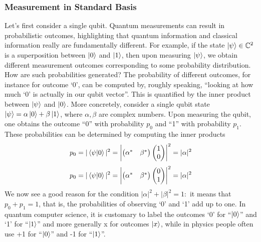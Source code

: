 \subsubsection{Measurement in Standard Basis}
Let’s first consider a single qubit. Quantum measurements can result in probabilistic outcomes,
highlighting that quantum information and classical information really are fundamentally different.
For example, if the state $\ket{\psi} \in \mathbb{C}^2$ is a superposition between $\ket{0}$ and $\ket{1}$, then upon measuring $\ket{\psi}$, we obtain different measurement outcomes corresponding to some probability distribution. How are such probabilities generated? The probability of different outcomes, for instance for outcome ‘0’, can be computed by, roughly speaking, “looking at how much ‘0’ is actually in our qubit vector”. This is quantified by the inner product between $\ket{\psi}$ and $\ket{0}$. More concretely, consider a single
qubit state $\ket{\psi}=\alpha\ket{0}+\beta\ket{1}$, where $\alpha,\beta$ are complex numbers. Upon measuring the qubit, one obtains the outcome “0” with probability $p_0$ and “1” with probability $p_1$. These probabilities can
be determined by computing the inner products
\[
p_0=|\braket{\psi|0}|^2=\begin{vmatrix} \begin{pmatrix}\alpha^* & \beta^* \end{pmatrix} \begin{pmatrix} 1 \\ 0 \end{pmatrix} \end{vmatrix}^2=|\alpha|^2
\]
\[
p_0=|\braket{\psi|0}|^2=\begin{vmatrix} \begin{pmatrix}\alpha^* & \beta^* \end{pmatrix} \begin{pmatrix} 0 \\ 1 \end{pmatrix} \end{vmatrix}^2=|\alpha|^2
\]
We now see a good reason for the condition $|\alpha|^2+|\beta|^2=1:$ it means that $p_0 + p_1 = 1$, that is, the
probabilities of observing ‘0’ and ‘1’ add up to one. In quantum computer science, it is customary
to label the outcomes ‘0’ for “$\ket{0}$” and ‘1’ for “$\ket{1}$” and more generally x for outcomes $\ket{x}$, while in physics people often use +1 for “$\ket{0}$” and -1 for “$\ket{1}$”.

